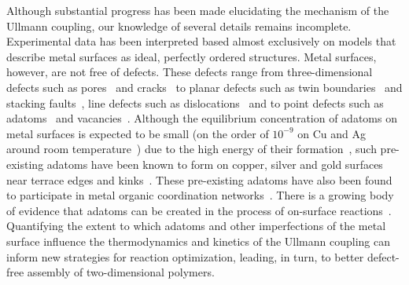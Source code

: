 \documentclass[aps,prb,amsmath,amssymb,11pt]{revtex4-1}
\newcommand{\zhzh}{\color{black}}
\renewcommand{\sout}[1]{\unskip}
\begin{document}
Although substantial progress has been made elucidating the mechanism of the Ullmann coupling, our knowledge of several details remains incomplete. Experimental data has been interpreted based almost exclusively on models that describe metal surfaces as ideal, perfectly ordered structures. 
%
Metal surfaces, however, are not free of defects. These defects range from three-dimensional defects such as pores~\cite{ullmann_72} and cracks~\cite{ullmann_73} to planar defects such as twin boundaries~\cite{ullmann_74} and stacking faults~\cite{ullmann_75}, line defects such as dislocations~\cite{Ullmann_76} and to point defects such as adatoms~\cite{Ullmann_77} and vacancies~\cite{ullmann_78}.
%
\sout{It is well known that adatoms are created on clean copper, silver and gold surfaces~\cite{ullmann_79, ullmann_58}, especially near terrace edges and kinks~\cite{ullmann_84, ullmann_85}, in the process of the thermal motion of metal atoms. 
Although the equilibrium concentration of adatoms on clean surfaces is expected to be extremely small due to the high energy of their formation~\cite{chemeurope2017}, such pre-existing adatoms have been known to participate in metal organic coordination networks~\cite{ullmann_80, ullmann_81, ullmann_82, ullmann_83}.}
{\zhzh Although the equilibrium concentration of adatoms on metal surfaces is expected to be small (on the order of $10^{-9}$ on Cu and Ag around room temperature~\cite{giesen2001step}) due to the high energy of their formation~\cite{chemeurope2017}, such pre-existing adatoms have been known to form on copper, silver and gold surfaces~\cite{ullmann_79, ullmann_58} near terrace edges and kinks~\cite{ullmann_84, ullmann_85}. These pre-existing adatoms have also been found to participate in metal organic coordination networks~\cite{ullmann_80, ullmann_81, ullmann_82, ullmann_83, ullmann_170, ullmann_147}.}
There is \sout{also} a growing body of evidence that adatoms can be created in the process of on-surface reactions~\cite{ullmann_146, ullmann_53, chematerial2019, ullmann_147, chemeurope2017, ullmann_98, ullmann_91}. %
Quantifying the extent to which adatoms and other imperfections of the metal surface influence the thermodynamics and kinetics of the Ullmann coupling can inform new strategies for reaction optimization, leading, in turn, to better defect-free assembly of two-dimensional polymers. 
\end{document}

